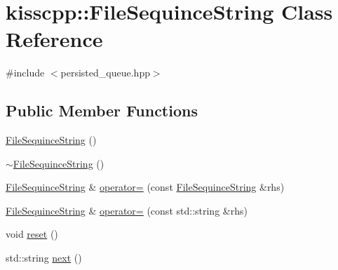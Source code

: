 \hypertarget{a00026}{\section{kisscpp\-:\-:File\-Sequince\-String Class Reference}
\label{a00026}
}


{\ttfamily \#include $<$persisted\-\_\-queue.\-hpp$>$}

\subsection*{Public Member Functions}
\begin{DoxyCompactItemize}
\item 
\hyperlink{a00026_ab378cb573d6b5fbef2669823e51b0bd6}{File\-Sequince\-String} ()
\item 
\hyperlink{a00026_a65e065469610a9c0405faf7af34e10c8}{$\sim$\-File\-Sequince\-String} ()
\item 
\hyperlink{a00026}{File\-Sequince\-String} \& \hyperlink{a00026_a942e78a3d1ba76e8b8d5671c4ca9358d}{operator=} (const \hyperlink{a00026}{File\-Sequince\-String} \&rhs)
\item 
\hyperlink{a00026}{File\-Sequince\-String} \& \hyperlink{a00026_a0a5f8c8c6fba6177297c98dbe92b5772}{operator=} (const std\-::string \&rhs)
\item 
void \hyperlink{a00026_a501332a509814ab09021030b3e433a94}{reset} ()
\item 
std\-::string \hyperlink{a00026_ac836ea7811841f47eaeeb0f749ae74dc}{next} ()
\end{DoxyCompactItemize}


